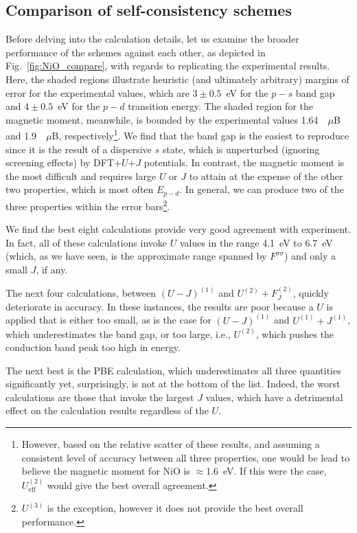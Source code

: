 \subsection{Comparison of self-consistency schemes}

Before delving into the calculation details, 
let us examine the broader performance of 
the schemes against each other, 
as depicted in Fig.~\ref{fig:NiO_compare}, 
with regards to replicating the experimental results.
%
Here, the shaded regions illustrate heuristic 
(and ultimately arbitrary) 
margins of error for the experimental values, 
which are $3\pm0.5$~eV for the $p-s$ band gap 
and $4\pm0.5$~eV for the $p-d$ transition energy.
%
The shaded region for the magnetic moment, 
meanwhile, is bounded by the experimental values 
1.64~\cite{alperin1962nio}~$\mu$B and 1.9~\cite{PhysRevB.27.6964}~$\mu$B, 
respectively\footnote{However, 
based on the relative scatter of these results, 
and assuming a consistent level of accuracy 
between all three properties, 
one would be lead to believe the magnetic moment for NiO is $\approx$1.6~eV. 
If this were the case, $U_\textrm{eff}^{(2)}$ would give the best overall agreement.}. 
%
We find that the band gap is the easiest to reproduce  
since it is the result of a dispersive $s$ state, 
which is unperturbed (ignoring screening effects) 
by DFT+$U$+$J$ potentials.
%
In contrast, the magnetic moment is the most 
difficult and requires large $U$ or $J$ to attain 
at the expense of the other two properties, 
which is most often $E_{p-d}$.
%
In general, we can produce two of 
the three properties within the error 
bars\footnote{$U^{(3)}$ is the exception, 
however it does not provide the 
best overall performance.}.

We find the best eight calculations provide 
very good agreement with experiment.
%
In fact, all of these calculations invoke $U$ values 
in the range 4.1~eV to 6.7~eV 
(which, as we have seen, 
is the approximate range spanned by 
$F^{\sigma\sigma}$)
and only a small $J$, if any.

The next four calculations, 
between $(U-J)^{(1)}$ and $U^{(2)}+F_J^{(2)}$, 
quickly deteriorate in accuracy.
%
In these instances, 
the results are poor because a $U$ is applied 
that is either too small, 
as is the case for  $(U-J)^{(1)}$  and $U^{(1)}+J^{(1)}$, 
which underestimates the band gap, 
or too large, i.e., $U^{(2)}$, 
which pushes the conduction band peak too high in energy.

The next best is the PBE calculation, 
which underestimates all three quantities significantly 
yet, surprisingly, is not at the bottom of the list.
%
Indeed, the worst calculations 
are those that invoke the largest $J$ values, 
which have a detrimental effect on the 
calculation results regardless of the $U$.

